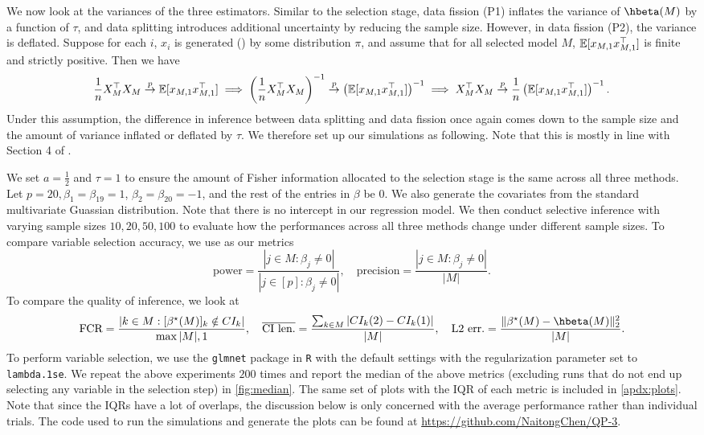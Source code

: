 We now look at the variances of the three estimators. Similar to the selection stage, data fission (P1) inflates the variance of $\hbeta(M)$ by a function of $\tau$, and data splitting introduces additional uncertainty by reducing the sample size. However, in data fission (P2), the variance is deflated. Suppose for each $i$, $x_i$ is generated (\iid) by some distribution $\pi$, and assume that for all selected model $M$, $\mathbb{E}[x_{M,1}x_{M,1}^\top]$ is finite and strictly positive. Then we have
\[
\frac{1}{n}X_M^\top X_M \overset{p}{\to} \mathbb{E}[x_{M,1}x_{M,1}^\top] \implies \left(\frac{1}{n}X_M^\top X_M\right)^{-1} \overset{p}{\to} \left( \mathbb{E}[x_{M,1}x_{M,1}^\top] \right)^{-1} \implies X_M^\top X_M \overset{p}{\to} \frac{1}{n}\left( \mathbb{E}[x_{M,1}x_{M,1}^\top] \right)^{-1}.
\]
Under this assumption, the difference in inference between data splitting and data fission once again comes down to the sample size and the amount of variance inflated or deflated by $\tau$. We therefore set up our simulations as following. Note that this is mostly in line with Section 4 of \cite{leiner2022data}.

We set $a = \frac{1}{2}$ and $\tau=1$ to ensure the amount of Fisher information allocated to the selection stage is the same across all three methods. Let $p=20, \beta_1=\beta_{19}=1$, $\beta_2=\beta_{20}=-1$, and the rest of the entries in $\beta$ be $0$. We also generate the covariates from the standard multivariate Guassian distribution. Note that there is no intercept in our regression model. We then conduct selective inference with varying sample sizes $10, 20, 50, 100$ to evaluate how the performances across all three methods change under different sample sizes. To compare variable selection accuracy, we use as our metrics
\[
\text{power} = \frac{|j\in M: \beta_j \neq 0|}{|j\in [p]: \beta_j \neq 0|}, \quad \text{precision} = \frac{|j\in M: \beta_j \neq 0|}{|M|}.
\]
To compare the quality of inference, we look at
\[
\text{FCR} = \frac{|k\in M: [\beta^\star(M)]_k \notin CI_k|}{\max{|M|, 1}}, \quad \overline{\text{CI len.}} = \frac{\sum_{k\in M} |CI_k(2) - CI_k(1)|}{|M|}, \quad \text{L2 err.} = \frac{\| \beta^\star(M) - \hbeta(M) \|_2^2}{|M|}.
\]
To perform variable selection, we use the \texttt{glmnet} package in \texttt{R} with the default settings with the regularization parameter set to \texttt{lambda.1se}. We repeat the above experiments $200$ times and report the median of the above metrics (excluding runs that do not end up selecting any variable in the selection step) in \cref{fig:median}. The same set of plots with the IQR of each metric is included in \cref{apdx:plots}. Note that since the IQRs have a lot of overlaps, the discussion below is only concerned with the average performance rather than individual trials. The code used to run the simulations and generate the plots can be found at \url{https://github.com/NaitongChen/QP-3}.

